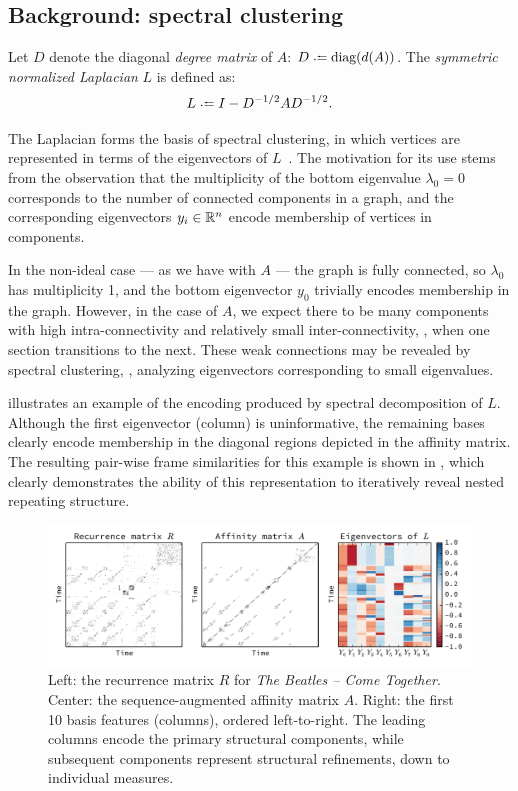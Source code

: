 \documentclass{article}
\begin{document}
\subsection{Background: spectral clustering}
Let $D$ denote the diagonal \emph{degree matrix} of $A$: $D \defeq \diag(d(A))$.  
The \emph{symmetric normalized Laplacian} $L$ is defined as:
\begin{equation}
L \defeq I - D^{-1/2} A D^{-1/2}.\label{symlaplacian}
\end{equation}

The Laplacian forms the basis of spectral clustering, in which vertices are
represented in terms of the eigenvectors of $L$~\cite{von2007tutorial}.  
The motivation for its use stems from the observation that the multiplicity of the bottom
eigenvalue $\lambda_0 = 0$ corresponds to the number of connected components in a
graph, and the corresponding eigenvectors $y_i \in \mathbb{R}^n$ encode membership of vertices
in components.

In the non-ideal case --- as we have with $A$ --- the graph is fully connected, so
$\lambda_0$ has multiplicity 1, and the bottom eigenvector $y_0$ trivially encodes 
membership in the graph. 
However, in the case of $A$, we expect there to be many components
with high intra-connectivity and relatively small inter-connectivity, \ie, when 
one section transitions to the next.  
These weak connections may be revealed by spectral clustering, \ie, analyzing 
eigenvectors corresponding to small eigenvalues.

 illustrates an example of the encoding produced by spectral
decomposition of $L$.  Although the first eigenvector (column) is uninformative, 
the remaining bases clearly encode membership in the diagonal regions depicted in the 
affinity matrix.  The resulting pair-wise frame
similarities for this example is shown in , which clearly demonstrates
the ability of this representation to iteratively reveal nested repeating structure.

\begin{figure}
\centering
\includegraphics[width=\textwidth]{figs/recurrence}
\caption{Left: the recurrence matrix $R$ for \emph{The Beatles -- Come
Together}. Center: the sequence-augmented affinity matrix $A$.
Right: the first 10 basis features (columns), ordered left-to-right.  
The leading columns encode the primary structural components, while subsequent
components represent structural refinements, down to individual measures.\label{recurrence}}
\end{figure}
\end{document}
